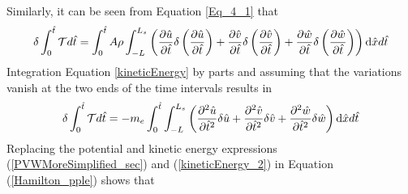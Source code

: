 \documentclass[3p,doublespacing,authoryear,11pt]{elsarticle} %
\begin{document}
Similarly, it can be seen from Equation \ref{Eq_4_1} that 
\begin{equation}\label{kineticEnergy}
  \begin{array}{l } 
\displaystyle 
\delta \int_{0}^{\hat{t}} \mathcal{T}  d \hat{t}=  \int_{0}^{\hat{t}} A \rho \int_{-L}^{L_s} \left( \frac{\partial \hat{u}}{\partial \hat{t}} \delta \left(\frac{\partial \hat{u}}{\partial \hat{t}} \right)+  \frac{\partial \hat{v}}{\partial \hat{t}} \delta \left(\frac{\partial \hat{v}}{\partial \hat{t}} \right) +  \frac{\partial \hat{w}}{\partial \hat{t}} \delta \left(\frac{\partial \hat{w}}{\partial \hat{t}}  \right) \right)\textup{d} \hat{x}  d \hat{t}
  \end{array}  
\end{equation}
Integration Equation {\ref{kineticEnergy}} by parts and assuming that the variations vanish at the two ends of the time intervals results in 
\begin{equation}\label{kineticEnergy_2}
  \begin{array}{l } 
\displaystyle 
\delta \int_{0}^{\hat{t}} \mathcal{T}  d \hat{t}=  - m_e \int_{0}^{\hat{t}}  \int_{-L}^{L_s} \left( \frac{\partial^2 \hat{u}}{\partial \hat{t}^2} \delta \hat{u} +  \frac{\partial^2 \hat{v}}{\partial \hat{t}^2} \delta \hat{v} +  \frac{\partial^2 \hat{w}}{\partial \hat{t}^2} \delta \hat{w} \right) \textup{d} \hat{x}  d \hat{t}
  \end{array}  
\end{equation}
Replacing the potential and kinetic energy expressions (\ref{PVWMoreSimplified_sec}) and (\ref{kineticEnergy_2}) in Equation (\ref{Hamilton_pple}) shows that
\end{document}
